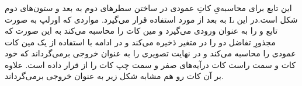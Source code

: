 \documentclass[a4paper,12pt]{article}
\begin{document}
     \subsubsection*{}
     این تابع برای محاسبه‌یِ کاتِ عمودی در ساختن سطر‌های دوم به بعد و ستون‌های دوم به بعد از 
     مورد استفاده قرار می‌گیرد. مواردی که اورلپ به صورت L شکل است.در این تابع 
     و
     را به عنوان ورودی می‌گیرد و مین کات را محاسبه می‌کند به این صورت که مجذورِ تفاضل دو 
     را در متغیر 
     ذخیره می‌کند و در ادامه با استفاده از 
     یک مین کات عمودی را محاسبه می‌کند و در نهایت تصویری را به عنوان خروجی بر‌می‌گرداند که خود کات و سمت راست کات درآیه‌های صفر
     و سمت چپ کات را از 
     قرار داده است. علاوه بر آن کات رو هم مشابه شکل زیر به عنوان خروجی برمی‌گرداند.
\end{document}

